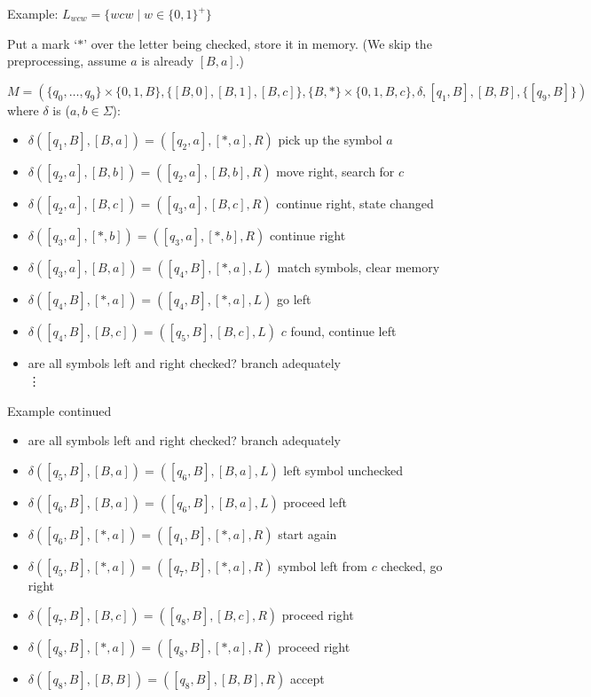 \documentclass[handout]{beamer}
\begin{document}
\begin{frame}{Example: $L_{wcw}=\{wcw\mid w \in \{0,1\}^+\}$}

   
    Put a mark `$*$' over the letter being  checked, store it in memory. 
    (We skip the preprocessing, assume $a$ is already $[B,a]$.)

    $M=(\{q_0,\ldots,q_9\}\times\{0,1,B\},\{[B,0],[B,1],[B,c]\},\{B,*\}\times\{0,1,B,c\},\delta,[q_1,B],[B,B],\{[q_9,B]\})$ where $\delta$ is ($a,b\in\Sigma$):
    \begin{itemize}
        \item $\delta([q_1,B],[B,a])=([q_2,a],[*,a],R)$ pick up the symbol $a$
        \item $\delta([q_2,a],[B,b])=([q_2,a],[B,b],R)$ move right, search for $c$
        \item $\delta([q_2,a],[B,c])=([q_3,a],[B,c],R)$ continue right, state changed
        \item $\delta([q_3,a],[*,b])=([q_3,a],[*,b],R)$ continue right
        \item $\delta([q_3,a],[B,a])=([q_4,B],[*,a],L)$ match symbols, clear memory
        \item $\delta([q_4,B],[*,a])=([q_4,B],[*,a],L)$ go left
        \item $\delta([q_4,B],[B,c])=([q_5,B],[B,c],L)$ $c$ found, continue left
        \item are all symbols left and right checked? branch adequately\\
        \vdots
    \end{itemize}   

\end{frame}


\begin{frame}{Example continued}

    \begin{itemize}
        \item are all symbols left and right checked? branch adequately		
        \item $\delta([q_5,B],[B,a])=([q_6,B],[B,a],L)$  left symbol unchecked
        \item $\delta([q_6,B],[B,a])=([q_6,B],[B,a],L)$  proceed left
        \item $\delta([q_6,B],[*,a])=([q_1,B],[*,a],R)$  start again
        \item $\delta([q_5,B],[*,a])=([q_7,B],[*,a],R)$  symbol left from $c$ checked, go right
        \item $\delta([q_7,B],[B,c])=([q_8,B],[B,c],R)$  proceed right
        \item $\delta([q_8,B],[*,a])=([q_8,B],[*,a],R)$  proceed right
        \item $\delta([q_8,B],[B,B])=([q_8,B],[B,B],R)$  accept
    \end{itemize}
    
\end{frame}
\end{document}
